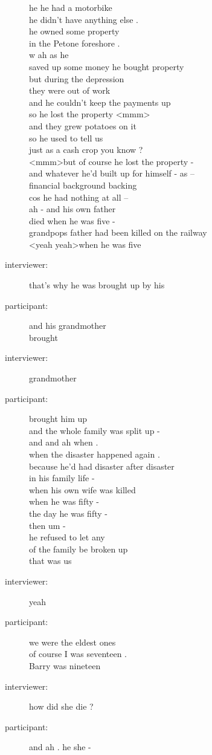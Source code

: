 \documentclass{article}
\newcommand{\turn}[2]{
\item[#1:] #2
}
\begin{document}
\begin{description}
{he he had a motorbike\\
he didn't have anything else .\\
he owned some property\\
in the Petone foreshore .\\
w ah as he\\
saved up some money he bought property\\
but during the depression\\
they were out of work\\
and he couldn't keep the payments up\\
so he lost the property \textless mmm\textgreater \\
and they grew potatoes on it\\
so he used to tell us\\
just as a cash crop you know ?\\
\textless mmm\textgreater  but of course he lost the property -\\
and whatever he'd built up for himself - as --\\
financial background backing\\
cos he had nothing at all --\\
ah - and his own father\\
died when he was five -\\
grandpops father had been killed on the railway\\
\textless yeah yeah\textgreater  when he was five}

\turn{interviewer}{that's why he was brought up by his}

\turn{participant}{and his grandmother\\
brought}

\turn{interviewer}{grandmother}

\turn{participant}{brought him up\\
and the whole family was split up -\\
and and ah when .\\
when the disaster happened again .\\
because he'd had disaster after disaster\\
in his family life -\\
when his own wife was killed\\
when he was fifty -\\
the day he was fifty -\\
then um -\\
he refused to let any\\
of the family be broken up\\
that was us}

\turn{interviewer}{yeah}

\turn{participant}{we were the eldest ones\\
of course I was seventeen .\\
Barry was nineteen}

\turn{interviewer}{how did she die ?}

\turn{participant}{and ah . he she -}


\end{description}
\end{document}
